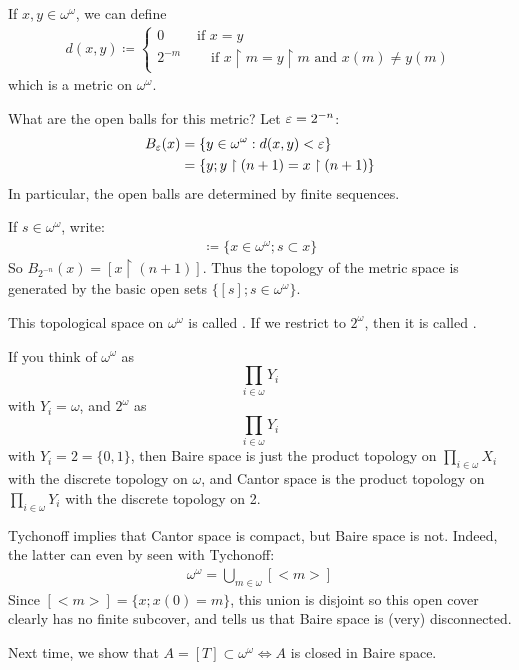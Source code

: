 \documentclass[]{article}
\newcommand{\om}{\omega}
\begin{document}
\begin{defin*}
    If $x,y \in \om^\om$, we can define
    \begin{align*}
        d(x,y) \coloneqq \left\lbrace \begin{array}{cc} 0\quad & \textrm{ if }x = y\\ 2^{-m} & \quad \textrm{ if }x\restriction m = y\restriction m\textrm{ and }x(m)\ne y(m) \end{array}\right.
    \end{align*}
    which is a metric on $\om^\om$.

    What are the open balls for this metric? Let $\varepsilon = 2^{-n}$:
    \begin{align*}
        B_\eps(x) &= \{y\in \om^\om : d(x,y) < \eps\}\\
        &= \{y; y\restriction (n+1) = x \restriction (n+1)\}
    \end{align*}
    In particular, the open balls are determined by finite sequences.

    If $s \in \om^\om$, write:
    \begin{align*}
        [s]\coloneqq \{x \in \om^\om ;s \subset x\}
    \end{align*}
    So $B_{2^{-n}}(x) = [x\restriction (n+1)]$. Thus the topology of the metric space is generated by the basic open sets $\{[s];s \in \om^\om\}$.

    This topological space on $\om^\om$ is called . If we restrict to $2^\om$, then it is called .
\end{defin*}

If you think of $\om^\om$ as $$\prod_{i\in \om}Y_i$$ with $Y_i = \om$, and $2^\om$ as $$\prod_{i\in \om}Y_i$$ with $Y_i = 2 = \{0,1\}$, then Baire space is just the product topology on $\prod_{i\in \om}X_i$ with the discrete topology on $\om$, and Cantor space is the product topology on $\prod_{i\in \om}Y_i$ with the discrete topology on 2.

Tychonoff implies that Cantor space is compact, but Baire space is not. Indeed, the latter can even by seen with Tychonoff:
\begin{align*}
    \om^\om = \bigcup_{m\in \om}[<m>]
\end{align*}
Since $[<m>] = \{x;x(0)=m\}$, this union is disjoint so this open cover clearly has no finite subcover, and tells us that Baire space is (very) disconnected.

Next time, we show that $A = [T] \subset \om^\om \iff A$ is closed in Baire space.
\end{document}

